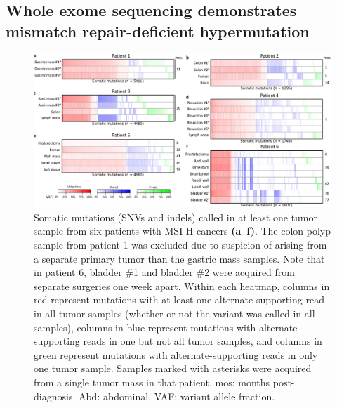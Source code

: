 \subsection[WES demonstrates mismatch repair-deficient hypermutation]{Whole exome sequencing demonstrates mismatch repair-\linebreak{}deficient hypermutation}
\begin{figure}[ht]
	\begin{center}
		\includegraphics[width=0.98\linewidth]{images/msiclones/mutations_by_sample_min0}
	\end{center}
	\vspace{-0.4cm}
	\caption[Somatic mutations (SNVs and indels) called in at least one tumor sample.]{Somatic mutations (SNVs and indels) called in at least one tumor sample from six patients with MSI-H cancers \textbf{(a--f)}. The colon polyp sample from patient 1 was excluded due to suspicion of arising from a separate primary tumor than the gastric mass samples. Note that in patient 6, bladder \#1 and bladder \#2 were acquired from separate surgeries one week apart. Within each heatmap, columns in red represent mutations with at least one alternate-supporting read in all tumor samples (whether or not the variant was called in all samples), columns in blue represent mutations with alternate-supporting reads in one but not all tumor samples, and columns in green represent mutations with alternate-supporting reads in only one tumor sample. Samples marked with asterisks were acquired from a single tumor mass in that patient. mos: months post-diagnosis. Abd: abdominal. VAF: variant allele fraction.}
	\label{fig:msiclones:mutation_heatmaps}
\end{figure}

